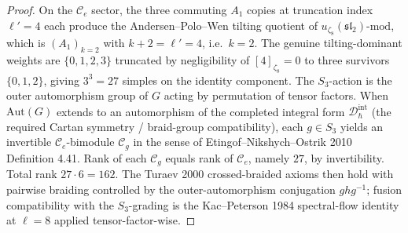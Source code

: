 \begin{proof}
On the $\mathcal{C}_e$ sector, the three commuting $A_1$ copies at truncation index $\ell' = 4$ each produce the Andersen--Polo--Wen tilting quotient of $u_{\zeta_8}(\mathfrak{sl}_2)$-$\mathrm{mod}$, which is $(A_1)_{k=2}$ with $k + 2 = \ell' = 4$, i.e.\ $k = 2$. The genuine tilting-dominant weights are $\{0,1,2,3\}$ truncated by negligibility of $[4]_{\zeta_8} = 0$ to three survivors $\{0,1,2\}$, giving $3^{3} = 27$ simples on the identity component. The $S_3$-action is the outer automorphism group of $G$ acting by permutation of tensor factors. When $\mathrm{Aut}(G)$ extends to an automorphism of the completed integral form $\mathcal{D}_\hbar^{\mathrm{int}}$ (the required Cartan symmetry / braid-group compatibility), each $g\in S_3$ yields an invertible $\mathcal{C}_e$-bimodule $\mathcal{C}_g$ in the sense of Etingof--Nikshych--Ostrik 2010 Definition 4.41. Rank of each $\mathcal{C}_g$ equals rank of $\mathcal{C}_e$, namely $27$, by invertibility. Total rank $27\cdot 6 = 162$. The Turaev 2000 crossed-braided axioms then hold with pairwise braiding controlled by the outer-automorphism conjugation $ghg^{-1}$; fusion compatibility with the $S_3$-grading is the Kac--Peterson 1984 spectral-flow identity at $\ell = 8$ applied tensor-factor-wise.
\end{proof}

